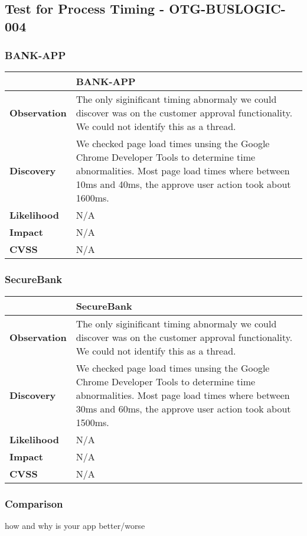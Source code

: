 \subsection{Test for Process Timing - OTG-BUSLOGIC-004}
\subsubsection{BANK-APP}
\begin{tabular*}{\textwidth}{ p{} | p{} }\hline
    & \textbf{BANK-APP} \\ \hline
    \textbf{Observation} & 
    	The only siginificant timing abnormaly we could discover was on the customer approval functionality.
    	We could not identify this as a thread.
    \\
    \textbf{Discovery} & 
    	We checked page load times unsing the Google Chrome Developer Tools to determine time abnormalities.
    	Most page load times where between 10ms and 40ms, the approve user action took about 1600ms.
    \\
    \textbf{Likelihood} & 
    	N/A
    \\
    \textbf{Impact} & 
    	N/A
    \\
    \textbf{CVSS} &
       	N/A
    \\ \hline
\end{tabular*}

\subsubsection{SecureBank}
\begin{tabular*}{\textwidth}{ p{} | p{} }\hline
    & \textbf{SecureBank} \\ \hline
    \textbf{Observation} & 
    	The only siginificant timing abnormaly we could discover was on the customer approval functionality.
    	We could not identify this as a thread.
    \\
    \textbf{Discovery} & 
    	We checked page load times unsing the Google Chrome Developer Tools to determine time abnormalities.
    	Most page load times where between 30ms and 60ms, the approve user action took about 1500ms.
    \\
    \textbf{Likelihood} & 
    	N/A
    \\
    \textbf{Impact} & 
    	N/A
    \\
    \textbf{CVSS} &
        N/A
    \\ \hline
\end{tabular*}

\subsubsection{Comparison}
how and why is your app better/worse
\clearpage